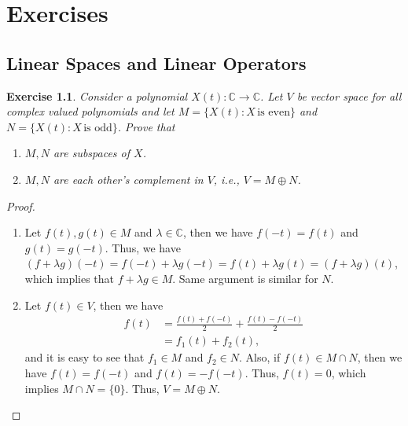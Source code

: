 \documentclass[10pt]{book}
\newtheorem{exercise}{Exercise}[section]
\theoremstyle{definition}
\numberwithin{equation}{chapter}
\begin{document}
\medskip















\chapter{Exercises}

\section{Linear Spaces and Linear Operators}
\begin{exercise}\label{ex_1}
Consider a polynomial $X(t):\mathbb{C}\to\mathbb{C}$. Let $V$ be vector space for all complex valued polynomials and let $M = \{X(t): X \,\text{is even}\}$ and $N = \{X(t): X \,\text{is odd}\}$. Prove that 
\begin{enumerate}[label=(\alph*)]
    \item $M,N$ are subspaces of $X$.
    \item $M, N$ are each other's complement in $V$, i.e., $V = M\oplus N$.
\end{enumerate}
\end{exercise}
\begin{proof}
~\begin{enumerate}[label=(\alph*)]
    \item Let $f(t), g(t)\in M$ and $\lambda\in\mathbb{C}$, then we have $f(-t) = f(t)$ and $g(t) = g(-t)$. Thus, we have $(f+\lambda g)(-t) = f(-t) + \lambda g(-t) = f(t) + \lambda g(t) = (f+\lambda g)(t)$, which implies that $f+\lambda g\in M$. Same argument is similar for $N$.
    \item Let $f(t)\in V$, then we have 
    \begin{align*}
        f(t) & = \frac{f(t) + f(-t)}{2} + \frac{f(t) - f(-t)}{2} \\
        & = f_1(t) + f_2(t),
    \end{align*}
    and it is easy to see that $f_1\in M$ and $f_2\in N$. Also, if $f(t)\in M\cap N$, then we have $f(t) = f(-t)$ and $f(t) = -f(-t)$. Thus, $f(t) = 0$, which implies $M\cap N = \{0\}$. Thus, $V = M\oplus N$.
\end{enumerate}
\end{proof}

\medskip
\end{document}
